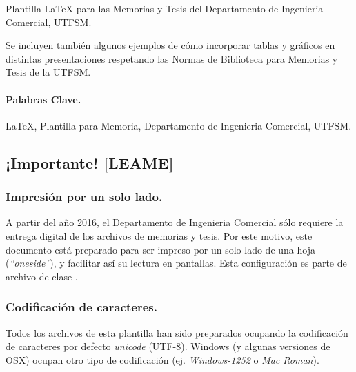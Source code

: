 
Plantilla \LaTeX{} para las Memorias y Tesis del Departamento de Ingenieria Comercial, UTFSM.

Se incluyen también algunos ejemplos de cómo incorporar tablas y gráficos en distintas presentaciones respetando las Normas de Biblioteca para Memorias y Tesis de la UTFSM.

\vspace{10mm}

\paragraph{Palabras Clave.}
\LaTeX{}, Plantilla para Memoria, Departamento de Ingenieria Comercial, UTFSM.

\vspace*{1cm}
\subsection*{¡Importante! [LEAME]}

\subsubsection*{Impresión por un solo lado.}
A partir del año 2016, el Departamento de Ingenieria Comercial sólo requiere la entrega digital de los archivos de memorias y tesis. Por este motivo, este documento está preparado para ser impreso por un solo lado de una hoja (\emph{``oneside''}), y facilitar así su lectura en pantallas. Esta configuración es parte de archivo de clase .

\subsubsection*{Codificación de caracteres.}

Todos los archivos  de esta plantilla han sido preparados ocupando la codificación de caracteres por defecto \emph{unicode} (UTF-8). Windows (y algunas versiones de OSX) ocupan otro tipo de codificación (ej. \emph{Windows-1252} o \emph{Mac Roman}).

